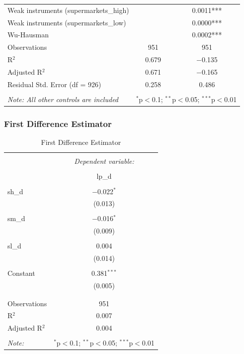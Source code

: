 \documentclass{article}
\begin{document}
\begin{table}[!htbp]
\begin{tabular}{@{\extracolsep{5pt}}lcc}
Weak instruments (supermarkets\_high) &  & 0.0011*** \\ 
Weak instruments (supermarkets\_low) &  & 0.0000*** \\ 
Wu-Hausman &  & 0.0002*** \\ 
Observations & 951 & 951 \\ 
R$^{2}$ & 0.679 & $-$0.135 \\ 
Adjusted R$^{2}$ & 0.671 & $-$0.165 \\ 
Residual Std. Error (df = 926) & 0.258 & 0.486 \\ 
\hline 
\hline \\[-1.8ex] 
\textit{Note: All other controls are included}  & \multicolumn{2}{r}{$^{*}$p$<$0.1; $^{**}$p$<$0.05; $^{***}$p$<$0.01} \\ 
\end{tabular} 
\end{table} 

\subsubsection{First Difference Estimator}
\begin{table}[H] \centering 
  \caption{First Difference Estimator} 
  \label{} 
\small 
\begin{tabular}{@{\extracolsep{-10pt}}lc} 
\\[-1.8ex]\hline 
\hline \\[-1.8ex] 
 & \multicolumn{1}{c}{\textit{Dependent variable:}} \\ 
\cline{2-2} 
\\[-1.8ex] & lp\_d \\ 
\hline \\[-1.8ex] 
 sh\_d & $-$0.022$^{*}$ \\ 
  & (0.013) \\ 
  & \\ 
 sm\_d & $-$0.016$^{*}$ \\ 
  & (0.009) \\ 
  & \\ 
 sl\_d & 0.004 \\ 
  & (0.014) \\ 
  & \\ 
 Constant & 0.381$^{***}$ \\ 
  & (0.005) \\ 
  & \\ 
\hline \\[-1.8ex] 
Observations & 951 \\ 
R$^{2}$ & 0.007 \\ 
Adjusted R$^{2}$ & 0.004 \\ 
\hline 
\hline \\[-1.8ex] 
\textit{Note:}  & \multicolumn{1}{r}{$^{*}$p$<$0.1; $^{**}$p$<$0.05; $^{***}$p$<$0.01} \\ 
\end{tabular} 
\end{table} 
\end{document}
